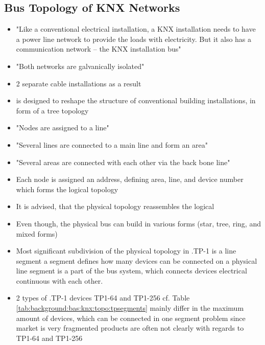 	\subsection{Bus Topology of KNX Networks}
	\begin{itemize}
		\item "Like a conventional electrical installation, a KNX installation needs to have a power line network to provide the loads with electricity. But it also has a communication network – the KNX installation bus" \parencite{Merz2009}
		\item "Both networks are galvanically isolated" \parencite{Merz2009}
		\item 2 separate cable installations as a result
		\item \knx is designed to reshape the structure of conventional building installations, in form of a tree topology \parencite{Merz2009}
		\item "Nodes are assigned to a line" \parencite{Merz2009}
		\item "Several lines are connected to a main line and form an area" \parencite{Merz2009}
		\item "Several areas are connected with each other via the back bone line" \parencite{Merz2009}
		\item Each node is assigned an address, defining area, line, and device number which forms the logical topology
			\subitem {}
		\item It is advised, that the physical topology reassembles the logical \parencite{Sokollik2017}
		\item Even though, the physical \knx bus can build in various forms (star, tree, ring, and mixed forms) \parencite{Sokollik2017}
		\item Most significant subdivision of the physical topology in \knx.TP-1 is a line segment \parencite{Sokollik2017}
			\subitem a segment defines how many \knx devices can be connected on a physical line \parencite{Sokollik2017}
			\subitem segment is a part of the bus system, which connects \knx devices electrical continuous with each other. \parencite{Sokollik2017}
		\item 2 types of \knx.TP-1 devices \parencite{Sokollik2017}
			\subitem TP1-64 and TP1-256 cf. Table \ref{tab:background:bas:knx:topo:tpsegments}
			\subitem mainly differ in the maximum amount of devices, which can be connected in one segment
			\subitem problem since market is very fragmented
			\subitem products are often not clearly with regards to TP1-64 and TP1-256

\end{itemize}

